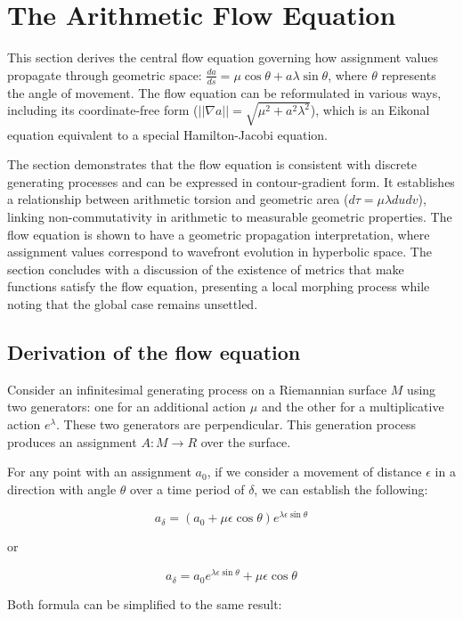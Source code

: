 \documentclass[12pt]{article}
\begin{document}
\section{The Arithmetic Flow Equation}

This section derives the central flow equation governing how assignment values propagate through geometric space: $\frac{da}{ds} = \mu \cos \theta + a \lambda \sin \theta$, where $\theta$ represents the angle of movement. The flow equation can be reformulated in various ways, including its coordinate-free form ($||\nabla a|| = \sqrt{\mu^2 + a^2 \lambda^2}$), which is an Eikonal equation equivalent to a special Hamilton-Jacobi equation.

The section demonstrates that the flow equation is consistent with discrete generating processes and can be expressed in contour-gradient form. It establishes a relationship between arithmetic torsion and geometric area ($d\tau = \mu \lambda du dv$), linking non-commutativity in arithmetic to measurable geometric properties. The flow equation is shown to have a geometric propagation interpretation, where assignment values correspond to wavefront evolution in hyperbolic space. The section concludes with a discussion of the existence of metrics that make functions satisfy the flow equation, presenting a local morphing process while noting that the global case remains unsettled.

\subsection{Derivation of the flow equation}\label{sec:equation-full}

Consider an infinitesimal generating process on a Riemannian surface $M$ using two generators:
one for an additional action $\mu$ and the other for a multiplicative action $e^\lambda$.
These two generators are perpendicular.
This generation process produces an assignment $A: M \to R$ over the surface.

For any point with an assignment $a_0$, if we consider a movement of distance $\epsilon$ in a direction with angle $\theta$
over a time period of $\delta$, we can establish the following:

\[
    a_{\delta} = (a_0 + \mu \epsilon \cos \theta)e^{\lambda \epsilon \sin \theta}
\]

or

\[
    a_{\delta} = a_0 e^{\lambda \epsilon \sin \theta} + \mu \epsilon \cos \theta
\]

Both formula can be simplified to the same result:
\end{document}
